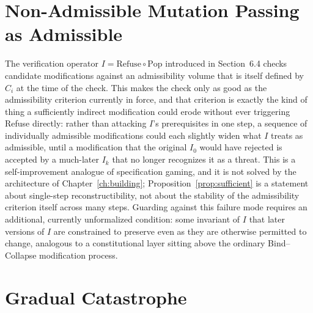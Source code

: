 \documentclass[11pt]{book}
\begin{document}
\section{Non-Admissible Mutation Passing as Admissible}

The verification operator $I = \mathrm{Refuse}\circ\mathrm{Pop}$ introduced in Section~6.4 checks candidate modifications against an admissibility volume that is itself defined by $C_i$ at the time of the check. This makes the check only as good as the admissibility criterion currently in force, and that criterion is exactly the kind of thing a sufficiently indirect modification could erode without ever triggering Refuse directly: rather than attacking $I$'s prerequisites in one step, a sequence of individually admissible modifications could each slightly widen what $I$ treats as admissible, until a modification that the original $I_0$ would have rejected is accepted by a much-later $I_k$ that no longer recognizes it as a threat. This is a self-improvement analogue of specification gaming, and it is not solved by the architecture of Chapter~\ref{ch:building}; Proposition~\ref{prop:sufficient} is a statement about single-step reconstructibility, not about the stability of the admissibility criterion itself across many steps. Guarding against this failure mode requires an additional, currently unformalized condition: some invariant of $I$ that later versions of $I$ are constrained to preserve even as they are otherwise permitted to change, analogous to a constitutional layer sitting above the ordinary Bind--Collapse modification process.

\section{Gradual Catastrophe}
\end{document}
